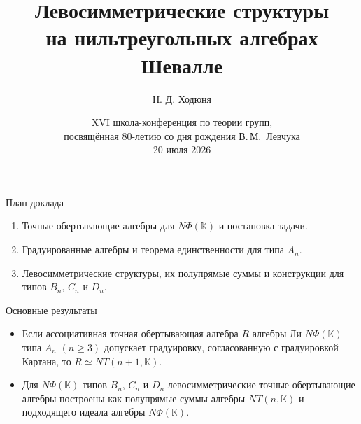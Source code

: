 \documentclass[12pt,aspectratio=169]{beamer}
\title[Левосимметрические структуры на $N\Phi(\K)$]{Левосимметрические структуры\\ на нильтреугольных алгебрах Шевалле}
\author[Н. Д. Ходюня]{Н. Д. Ходюня}
\institute[СФУ]{Сибирский Федеральный Университет}
\date[20.07.2026]{XVI школа-конференция по теории групп,\\посвящённая 80-летию со дня рождения В.\,М.~Левчука\\20 июля 2026}
\newcommand{\K}{\mathbb{K}}
\begin{document}
\begin{frame}[plain]
    \vfill
    \begin{center}
        {\inserttitle\par}
        \vspace{1.6em}
        {\insertauthor\par}
        \vspace{0.4em}
        {\insertinstitute\par}
    \end{center}
    \vfill
    \begin{center}
        {\insertdate\par}
    \end{center}
\end{frame}

\begin{frame}[t]{План доклада}
    \begin{enumerate}
        \item Точные обертывающие алгебры для $N\Phi(\K)$ и постановка задачи.
        \item Градуированные алгебры и теорема единственности для типа $A_n$.
        \item Левосимметрические структуры, их полупрямые суммы и конструкции для типов
              $B_n$, $C_n$ и $D_n$.
    \end{enumerate}

    \medskip

    \begin{alertblock}{Основные результаты}
        \begin{itemize}
            \item Если ассоциативная точная обертывающая алгебра $R$ алгебры Ли $N\Phi(\K)$ типа
                  $A_n$ $(n\ge 3)$ допускает градуировку, согласованную с градуировкой Картана,
                  то $R \simeq NT(n+1,\K)$.

            \item Для $N\Phi(\K)$ типов $B_n$, $C_n$ и $D_n$ левосимметрические
                  точные обертывающие алгебры построены как полупрямые суммы
                  алгебры $NT(n,\mathbb{K})$ и подходящего идеала алгебры
                  $N\Phi(\mathbb{K})$.%
        \end{itemize}
    \end{alertblock}
\end{frame}
\end{document}
